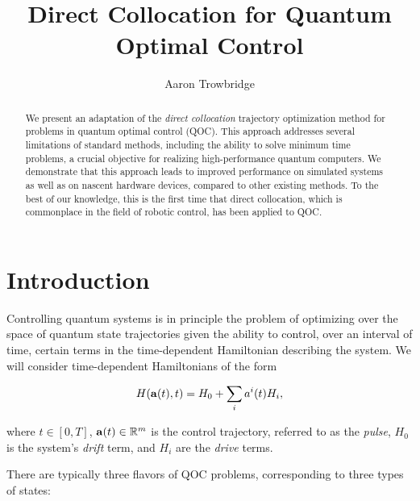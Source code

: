 \documentclass{article}
\title{
  Direct Collocation for Quantum Optimal Control 
}
\author{Aaron Trowbridge}
\date{}
\begin{document}
\maketitle


\begin{abstract}
  We present an adaptation of the \textit{direct collocation} trajectory optimization method for problems in quantum optimal control (QOC).  This approach addresses several limitations of standard methods, including the ability to solve minimum time problems, a crucial objective for realizing high-performance quantum computers.  We demonstrate that this approach leads to improved performance on simulated systems as well as on nascent hardware devices, compared to other existing methods.  To the best of our knowledge, this is the first time that direct collocation, which is commonplace in the field of robotic control, has been applied to QOC. 
\end{abstract}

\newpage

\tableofcontents

\newpage


\section{Introduction}
Controlling quantum systems is in principle the problem of optimizing over the space of quantum state trajectories given the ability to control, over an interval of time, certain terms in the time-dependent Hamiltonian describing the system. We will consider time-dependent Hamiltonians of the form

\begin{equation}
  H(\vb{a}(t), t) = H_0 + \sum_i a^i(t) H_i,
\end{equation}

\noindent
where $t \in [0, T]$, $\vb{a}(t) \in \mathbb{R}^m$ is the control trajectory, referred to as the \textit{pulse}, $H_0$ is the system's \textit{drift} term, and $H_i$ are the \textit{drive} terms.  

There are typically three flavors of QOC problems, corresponding to three types of states:
\end{document}
